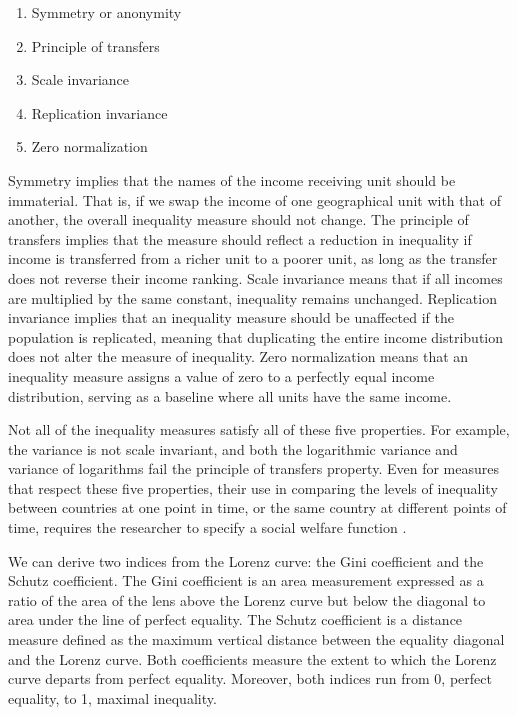 \documentclass[
  a4paper, 
  twoside,
  final
]{article}
\providecommand{\tightlist}{%
  \setlength{\itemsep}{0pt}\setlength{\parskip}{0pt}}\usepackage{longtable,booktabs,array}
\begin{document}
\begin{enumerate}
\def\labelenumi{\arabic{enumi}.}
\tightlist
\item
  Symmetry or anonymity
\item
  Principle of transfers
\item
  Scale invariance
\item
  Replication invariance
\item
  Zero normalization
\end{enumerate}

Symmetry implies that the names of the income receiving unit should be
immaterial. That is, if we swap the income of one geographical unit with
that of another, the overall inequality measure should not change. The
principle of transfers implies that the measure should reflect a
reduction in inequality if income is transferred from a richer unit to a
poorer unit, as long as the transfer does not reverse their income
ranking. Scale invariance means that if all incomes are multiplied by
the same constant, inequality remains unchanged. Replication invariance
implies that an inequality measure should be unaffected if the
population is replicated, meaning that duplicating the entire income
distribution does not alter the measure of inequality. Zero
normalization means that an inequality measure assigns a value of zero
to a perfectly equal income distribution, serving as a baseline where
all units have the same income.

Not all of the inequality measures satisfy all of these five properties.
For example, the variance is not scale invariant, and both the
logarithmic variance and variance of logarithms fail the principle of
transfers property. Even for measures that respect these five
properties, their use in comparing the levels of inequality between
countries at one point in time, or the same country at different points
of time, requires the researcher to specify a social welfare function
\citep{atkinson1970MeasurementInequality}.

We can derive two indices from the Lorenz curve: the Gini coefficient
and the Schutz coefficient. The Gini coefficient is an area measurement
expressed as a ratio of the area of the lens above the Lorenz curve but
below the diagonal to area under the line of perfect equality. The
Schutz coefficient is a distance measure defined as the maximum vertical
distance between the equality diagonal and the Lorenz curve. Both
coefficients measure the extent to which the Lorenz curve departs from
perfect equality. Moreover, both indices run from 0, perfect equality,
to 1, maximal inequality.
\end{document}
